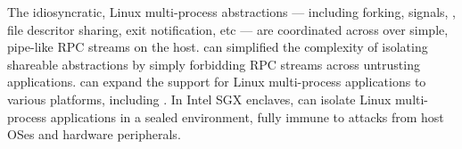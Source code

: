 The idiosyncratic, Linux multi-process abstractions
--- including forking, signals, \sysvipc{}, file descritor sharing, exit notification, etc
--- are coordinated across \picoprocs{}
over simple, pipe-like RPC streams on the host.
\graphene{} can simplified the complexity of isolating shareable abstractions
by simply forbidding RPC streams across untrusting applications.
\graphene{} can expand the support for Linux multi-process applications
to various platforms, including .
In Intel SGX enclaves, \graphene{} can isolate Linux multi-process applications
in a sealed environment,
fully immune to 
attacks from host OSes and hardware peripherals.




